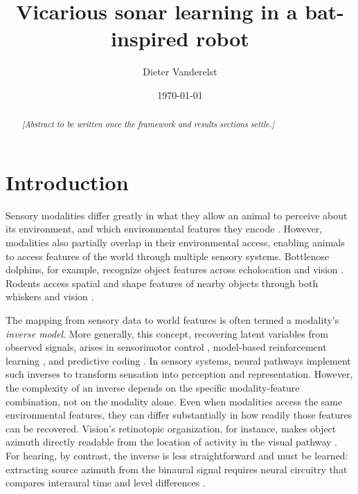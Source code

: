 \documentclass[11pt]{article}
\title{Vicarious sonar learning in a bat-inspired robot}
\author{Dieter Vanderelst}
\date{\today}
\begin{document}
\maketitle

\begin{abstract}
\noindent\textit{[Abstract to be written once the framework and results sections settle.]}
\end{abstract}

\section{Introduction}


Sensory modalities differ greatly in what they allow an animal to perceive about its environment, and which environmental features they encode \citep[e.g.,][]{Boonman2013,Page2021}. However, modalities also partially overlap in their environmental access, enabling animals to access features of the world through multiple sensory systems. Bottlenose dolphins, for example, recognize object features across echolocation and vision \citep{Herman1998,Harley2003,Bruck2022}. Rodents access spatial and shape features of nearby objects through both whiskers and vision \citep{Winters2010,Nikbakht2018,Guyoton2025}.


The mapping from sensory data to world features is often termed a modality's \emph{inverse model}. More generally, this concept, recovering latent variables from observed signals, arises in sensorimotor control \citep{Jordan1992,Wolpert1998}, model-based reinforcement learning \citep{Sutton1990,Ha2018}, and predictive coding \citep{Rao1999,Friston2010}. In sensory systems, neural pathways implement such inverses to transform sensation into perception and representation. However, the complexity of an inverse depends on the specific modality-feature combination, not on the modality alone. Even when modalities access the same environmental features, they can differ substantially in how readily those features can be recovered. Vision's retinotopic organization, for instance, makes object azimuth directly readable from the location of activity in the visual pathway \citep{Wandell2007,Szeliski2022}. For hearing, by contrast, the inverse is less straightforward and must be learned: extracting source azimuth from the binaural signal requires neural circuitry that compares interaural time and level differences \citep{Grothe2003}.
\end{document}
